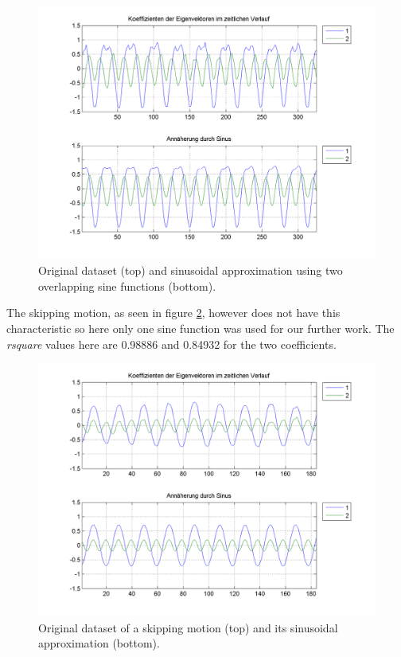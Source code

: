 \documentclass[a4paper]{article}
\begin{document}
\begin{figure}
		\centering
		\includegraphics[width=\textwidth]{2sinHamp.png}
		\caption{Original dataset (top) and sinusoidal approximation using two overlapping sine functions (bottom).}
		\label{fig:approx2}
\end{figure}

The skipping motion, as seen in figure \ref{fig:approx3}, however does not have this characteristic so here only one sine function was used for our further work.
The \emph{rsquare} values here are 0.98886 and 0.84932 for the two coefficients.

\begin{figure}
		\centering
		\includegraphics[width=\textwidth]{1sinSeil.png}
		\caption{Original dataset of a skipping motion (top) and its sinusoidal approximation (bottom).}
		\label{fig:approx3}
\end{figure}
\end{document}
